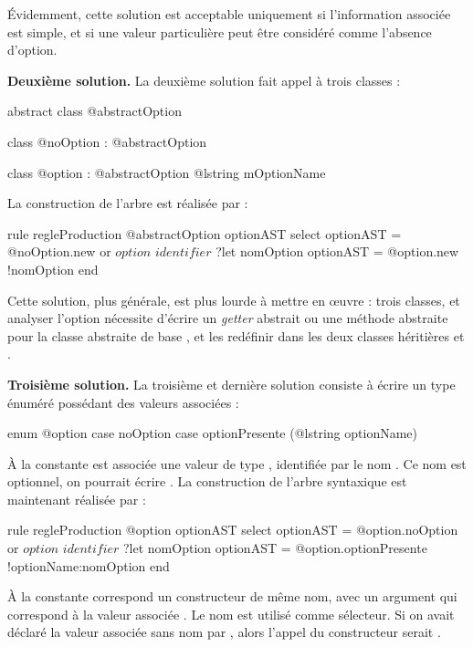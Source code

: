 Évidemment, cette solution est acceptable uniquement si l'information associée est simple, et si une valeur particulière peut être considéré comme l'absence d'option.

\textbf{Deuxième solution.} La deuxième solution fait appel à trois classes :
\begin{galgascode}
abstract class @abstractOption {}

class @noOption : @abstractOption {}

class @option : @abstractOption { @lstring mOptionName }
\end{galgascode}

La construction de l'arbre est réalisée par :
\begin{galgascode}
rule regleProduction {
  @abstractOption optionAST
  select
    optionAST = @noOption.new
  or
    $option$
    $identifier$ ?let nomOption
    optionAST = @option.new {!nomOption}
  end
}
\end{galgascode}

Cette solution, plus générale, est plus lourde à mettre en œuvre : trois classes, et analyser l'option nécessite d'écrire un \emph{getter} abstrait ou une méthode abstraite pour la classe abstraite de base , et les redéfinir dans les deux classes héritières  et .

\textbf{Troisième solution.} La troisième et dernière solution consiste à écrire un type énuméré possédant des valeurs associées :

\begin{galgascode}
enum @option {
  case noOption
  case optionPresente (@lstring optionName)
}
\end{galgascode}

À la constante  est associée une valeur de type , identifiée par le nom . Ce nom est optionnel, on pourrait écrire . La construction de l'arbre syntaxique est maintenant réalisée par :
\begin{galgascode}
rule regleProduction {
  @option optionAST
  select
    optionAST = @option.noOption
  or
    $option$
    $identifier$ ?let nomOption
    optionAST = @option.optionPresente {!optionName:nomOption}
  end
}
\end{galgascode}

À la constante  correspond un constructeur de même nom, avec un argument qui correspond à la valeur associée . Le nom  est utilisé comme sélecteur. Si on avait déclaré la valeur associée sans nom par , alors l'appel du constructeur serait .

